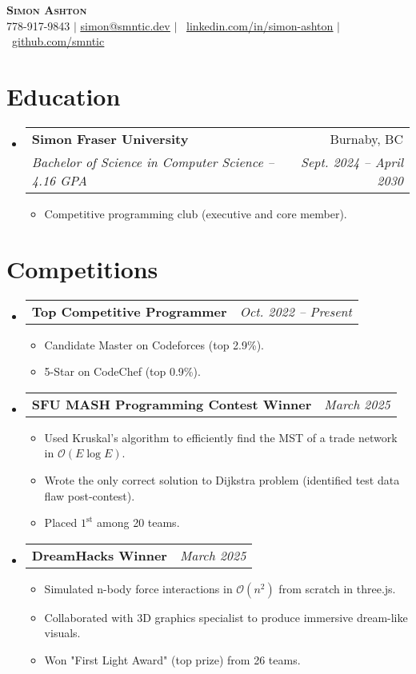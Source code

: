 \documentclass[letterpaper,11pt]{article}
\makeatletter
\newcommand{\resumeItem}[1]{
  \item\small{
    {#1 \vspace{-2pt}}
  }
}
\newcommand{\resumeSubheading}[5]{
  \vspace{-2pt}\item
    \begin{tabular*}{0.97\textwidth}[t]{l@{\extracolsep{\fill}}r}
      \textbf{#1} & #2 \\
      \textit{\small#3} & \textit{\small #4} \\
    \end{tabular*}
    \if\relax\detokenize{#5}\relax\else
      #5
    \fi
    \vspace{-7pt}
}
\newcommand{\resumeProjectHeading}[2]{
    \item
    \begin{tabular*}{0.97\textwidth}{l@{\extracolsep{\fill}}r}
      \small#1 & \textit{#2} \\
    \end{tabular*}\vspace{-7pt}
}
\newcommand{\resumeSubHeadingListStart}{\begin{itemize}[leftmargin=0.15in, label={}]}
\newcommand{\resumeSubHeadingListEnd}{\end{itemize}}
\newcommand{\resumeItemListStart}{\begin{itemize}[leftmargin=0.23in]}
\newcommand{\resumeItemListEnd}{\end{itemize}\vspace{-5pt}}
\newcommand{\bigO}{\mathcal{O}}
\makeatother
\begin{document}
\begin{center}
    \textbf{\Huge \scshape Simon Ashton} \\ \vspace{5pt}
    \small 778-917-9843 $|$ \href{mailto:simon@smntic.dev}{\underline{simon@smntic.dev}} $|$ 
    \raisebox{-0.05em}{\faLinkedin}\
    \href{https://linkedin.com/in/simon-ashton}{\underline{linkedin.com/in/simon-ashton}} $|$
    \raisebox{-0.1em}{\faGithub}\
    \href{https://github.com/smntic}{\underline{github.com/smntic}}
\end{center}


\section{Education}
  \resumeSubHeadingListStart
    \resumeSubheading
      {Simon Fraser University}{Burnaby, BC}
      {Bachelor of Science in Computer Science -- 4.16 GPA}{Sept. 2024 -- April 2030}
      \resumeItemListStart
        \resumeItem{Competitive programming club (executive and core member).}
      \resumeItemListEnd
  \resumeSubHeadingListEnd


\section{Competitions}
    \resumeSubHeadingListStart
      \resumeProjectHeading
          {\textbf{Top Competitive Programmer}}{Oct. 2022 -- Present}
          \resumeItemListStart
            \resumeItem{Candidate Master on Codeforces (top 2.9\%).}
            \resumeItem{5-Star on CodeChef (top 0.9\%).}
          \resumeItemListEnd
      \resumeProjectHeading
          {\textbf{SFU MASH Programming Contest Winner}}{March 2025}
          \resumeItemListStart
            \resumeItem{Used Kruskal's algorithm to efficiently find the MST of a trade network in $\bigO(E \log E)$.}
            \resumeItem{Wrote the only correct solution to Dijkstra problem (identified test data flaw post-contest).}
            \resumeItem{Placed $1^\text{st}$ among 20 teams.}
          \resumeItemListEnd
      \resumeProjectHeading
          {\textbf{DreamHacks Winner}}{March 2025}
          \resumeItemListStart
            \resumeItem{Simulated n-body force interactions in $\bigO(n^2)$ from scratch in three.js.}
            \resumeItem{Collaborated with 3D graphics specialist to produce immersive dream-like visuals.}
            \resumeItem{Won "First Light Award" (top prize) from 26 teams.}
          \resumeItemListEnd
    \resumeSubHeadingListEnd
\end{document}
